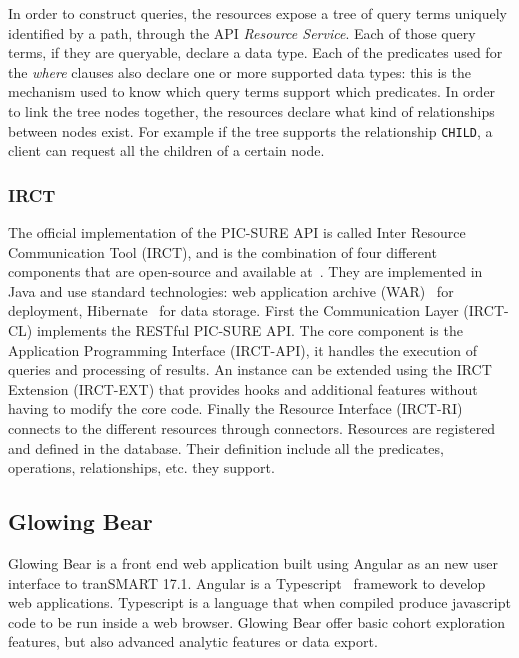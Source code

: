 In order to construct queries, the resources expose a tree of query terms uniquely identified by a path, through the API \emph{Resource Service}.
Each of those query terms, if they are queryable, declare a data type.
Each of the predicates used for the \emph{where} clauses also declare one or more supported data types: this is the mechanism used to know which query terms support which predicates.
In order to link the tree nodes together, the resources declare what kind of relationships between nodes exist.
For example if the tree supports the relationship \verb|CHILD|, a client can request all the children of a certain node. 


\subsubsection*{IRCT}

The official implementation of the PIC-SURE API is called Inter Resource Communication Tool (IRCT), and is the combination of four different components that are open-source and available at~\cite{github:IRCT}. 
They are implemented in Java and use standard technologies: web application archive (WAR)~\cite{wiki:war} for deployment, Hibernate~\cite{wiki:hibernate} for data storage.
First the Communication Layer (IRCT-CL) implements the RESTful PIC-SURE API. 
The core component is the Application Programming Interface (IRCT-API), it handles the execution of queries and processing of results.
An instance can be extended using the IRCT Extension (IRCT-EXT) that provides hooks and additional features without having to modify the core code.
Finally the Resource Interface (IRCT-RI) connects to the different resources through connectors.
Resources are registered and defined in the database.
Their definition include all the predicates, operations, relationships, etc. they support.


\subsection{Glowing Bear}

Glowing Bear is a front end web application built using Angular as an new user interface to tranSMART 17.1.
Angular is a Typescript~\cite{bierman2014understanding} framework to develop web applications.
Typescript is a language that when compiled produce javascript code to be run inside a web browser.
Glowing Bear offer basic cohort exploration features, but also advanced analytic features or data export.


